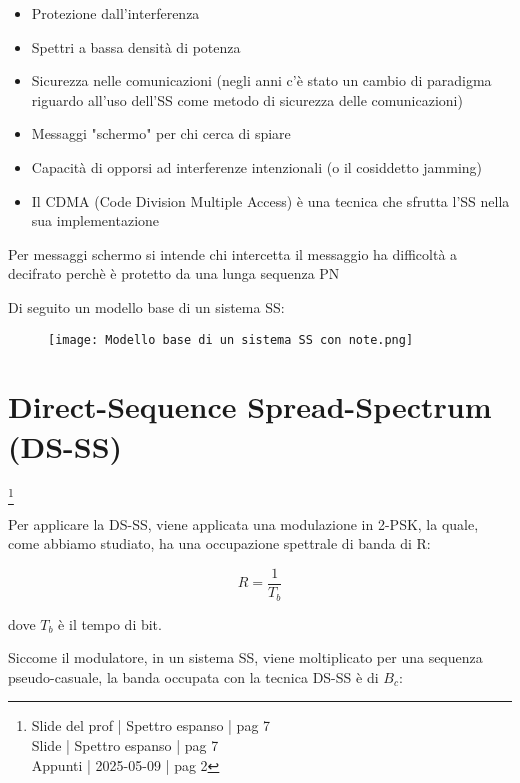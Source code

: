 \begin{itemize}
    \item Protezione dall'interferenza 
    \item Spettri a bassa densità di potenza 
    \item Sicurezza nelle comunicazioni (negli anni c'è stato un cambio di paradigma riguardo all'uso dell'SS come metodo di sicurezza delle comunicazioni) 
    \item Messaggi "schermo" per chi cerca di spiare 
    \item Capacità di opporsi ad interferenze intenzionali (o il cosiddetto jamming)
    \item Il CDMA (Code Division Multiple Access) è una tecnica che sfrutta l'SS nella sua implementazione
\end{itemize}

\begin{tcolorbox}
Per messaggi schermo si intende chi intercetta il messaggio ha difficoltà a decifrato perchè è protetto da una lunga sequenza PN
\end{tcolorbox}

Di seguito un modello base di un sistema SS: 

\begin{figure}[h]
    \centering
    \texttt{[image: Modello base di un sistema SS con note.png]}
\end{figure}

\newpage 

\section{Direct-Sequence Spread-Spectrum (DS-SS) }
\footnote{Slide del prof | Spettro espanso | pag 7 \\
Slide | Spettro espanso | pag 7 \\
Appunti | 2025-05-09 | pag 2
} 

Per applicare la DS-SS, 
viene applicata una modulazione in 2-PSK, 
la quale, come abbiamo studiato, 
ha una occupazione spettrale di banda di R: 

{
    \Large 
    \begin{equation}
        R = \frac{1}{T_b}
    \end{equation}
}

dove $T_b$ è il tempo di bit. \newline 

Siccome il modulatore, in un sistema SS, 
viene moltiplicato per una sequenza pseudo-casuale, 
la banda occupata con la tecnica DS-SS è di $B_c$:

